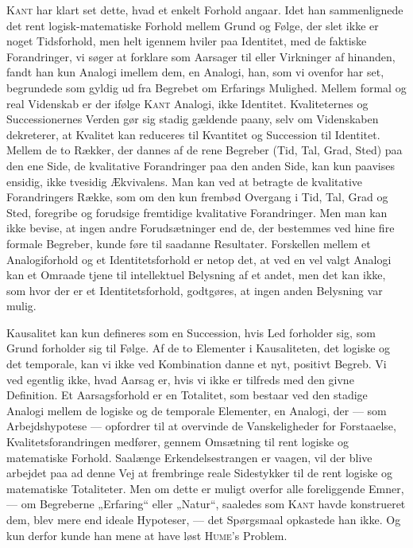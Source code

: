 \documentclass[12pt]{article}
\newcommand{\opage}[1]{\marginnote{\footnotesize\textit{[#1]}}}
\begin{document}
\textsc{Kant} har klart set dette, hvad et enkelt Forhold angaar. Idet han
sammenlignede det rent logisk-matematiske Forhold mellem Grund og Følge, der
slet ikke er noget Tidsforhold, men helt igennem hviler paa Identitet, med de
faktiske Forandringer, vi søger at forklare som Aarsager til eller Virkninger af
hinanden, fandt han kun Analogi imellem dem, en Analogi, han, som vi ovenfor har
set, begrundede som gyldig ud fra Begrebet om Erfarings Mulighed. Mellem formal
og real Videnskab er der ifølge \textsc{Kant} Analogi, ikke Identitet.
Kvaliteternes og Successionernes Verden gør sig stadig gældende paany, selv om
Videnskaben dekreterer, at Kvalitet kan reduceres til Kvantitet og Succession
til Identitet. Mellem de to Rækker, der dannes af de rene Begreber (Tid, Tal,
Grad, Sted) paa den ene Side, de kvalitative Forandringer paa den anden Side,
kan kun paavises ensidig, ikke tvesidig Ækvivalens. Man kan ved at betragte de
kvalitative Forandringers Række, som om den kun frembød Overgang i Tid, Tal,
Grad og Sted, foregribe og forudsige fremtidige kvalitative Forandringer. Men
man kan ikke bevise, at ingen andre Forudsætninger end de, der bestemmes ved
hine fire formale Begreber, kunde føre til saadanne Resultater. Forskellen
mellem et Analogiforhold og et Identitetsforhold er netop det, at ved en vel
valgt Analogi kan et Omraade tjene til intellektuel Belysning af et andet, men
det kan ikke, som hvor der er et Identitetsforhold, godtgøres, at ingen anden
Belysning var mulig.

\setcounter{footnote}{0}%
\opage{45}Kausalitet kan kun defineres som en Succession, hvis Led forholder
sig, som Grund forholder sig til Følge. Af de to Elementer i Kausaliteten, det
logiske og det temporale, kan vi ikke ved Kombination danne et nyt, positivt
Begreb. Vi ved egentlig ikke, hvad Aarsag er, hvis vi ikke er tilfreds med den
givne Definition. Et Aarsagsforhold er en Totalitet, som bestaar ved den stadige
Analogi mellem de logiske og de temporale Elementer, en Analogi, der --- som
Arbejdshypotese --- opfordrer til at overvinde de Vanskeligheder for
Forstaaelse, Kvalitetsforandringen medfører, gennem Omsætning til rent logiske
og matematiske Forhold. Saalænge Erkendelsestrangen er vaagen, vil der blive
arbejdet paa ad denne Vej at frembringe reale Sidestykker til de rent logiske og
matematiske Totaliteter. Men om dette er muligt overfor alle foreliggende Emner,
--- om Begreberne „Erfaring“ eller „Natur“, saaledes som \textsc{Kant} havde
konstrueret dem, blev mere end ideale Hypoteser, --- det Spørgsmaal opkastede
han ikke. Og kun derfor kunde han mene at have løst \textsc{Hume}'s Problem.
\end{document}
